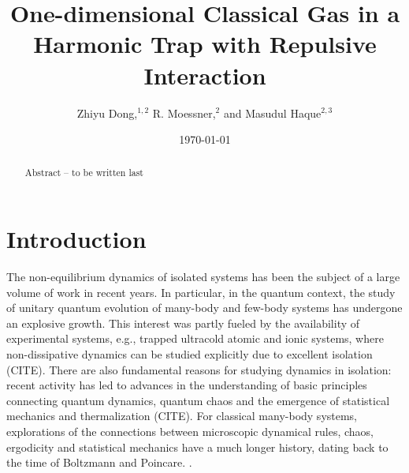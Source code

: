 \documentclass[onecolumn,pra]{revtex4-1}
\begin{document}
\title{One-dimensional Classical Gas in a Harmonic Trap with Repulsive Interaction}

\author{
Zhiyu Dong,$^{1,2}$
R. Moessner,$^2$
and Masudul Haque$^{2,3}$}





\date{\today}
 
 
\begin{abstract}

Abstract --  to be written last
   
\end{abstract}

\maketitle


\section{Introduction}


The non-equilibrium dynamics of isolated systems has been the subject of a large volume of work in
recent years.  In particular, in the quantum context, the study of unitary quantum evolution of
many-body and few-body systems has undergone an explosive growth.  This interest was partly fueled
by the availability of experimental systems, e.g., trapped ultracold atomic and ionic systems, where
non-dissipative dynamics can be studied explicitly due to excellent isolation (CITE).  There are
also fundamental reasons for studying dynamics in isolation: recent activity has led to advances in
the understanding of basic principles connecting quantum dynamics, quantum chaos and the emergence
of statistical mechanics and thermalization (CITE).  For classical many-body systems, explorations
of the connections between microscopic dynamical rules, chaos, ergodicity and statistical mechanics
have a much longer history, dating back to the time of Boltzmann and Poincare.
\cite{Dorfman_book_1999, Dumas_book_KAMstory, Boltzmann_legacy_book, EckmannRuelle_RMP85}.
\end{document}
